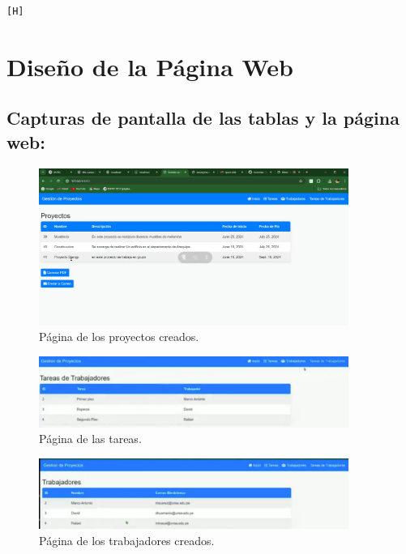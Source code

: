 \documentclass{article}
\begin{document}
\begin{itemize}
\begin{itemize}
\begin{lstlisting}[language=Python,caption={views.py}][H]
    \end{lstlisting}
\end{itemize}


\section{Diseño de la Página Web}
\subsection{Capturas de pantalla de las tablas y la página web:}

 \begin{figure}[h]
    \centering
    \includegraphics[width=0.9\textwidth]{img/principal.png}
    \caption{Página de los proyectos creados.}
\end{figure}

\begin{figure}[h]
    \centering
    \includegraphics[width=0.9\textwidth]{img/template2.png}
    \caption{Página de las tareas.}
\end{figure}

\begin{figure}[h]
    \centering
    \includegraphics[width=0.9\textwidth]{img/template3.png}
    \caption{Página de los trabajadores creados.}
\end{figure}


\end{itemize}
\end{document}
